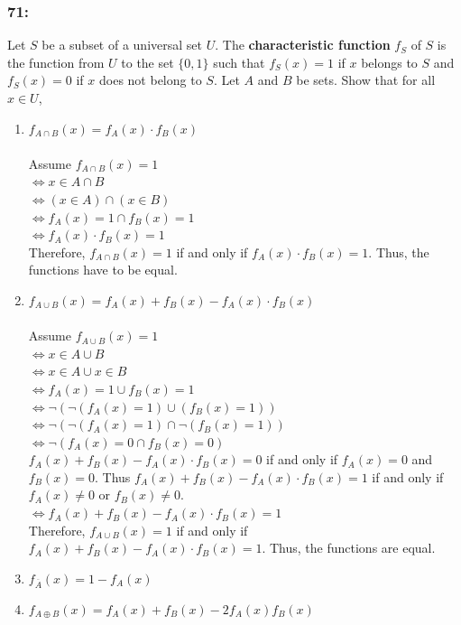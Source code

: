\documentclass[12pt,en,a4paper]{article}
\begin{document}
	\subsubsection*{71:}
	Let $S$ be a subset of a universal set $U$. The \textbf{characteristic function} $f_S$ of $S$ is the function from $U$ to the set $\{0,1\}$ such that $f_S(x)=1$ if $x$ belongs to $S$ and $f_S(x)=0$ if $x$ does not belong to $S$. Let $A$ and $B$ be sets. Show that for all $x\in U$,
	\begin{enumerate}[label=\textbf{\alph*)}]
		\item $f_{A\cap B}(x)=f_A(x)\cdot f_B(x)$\\\\
		Assume $f_{A\cap B}(x)=1$\\
		$\Leftrightarrow x\in A\cap B$\\
		$\Leftrightarrow (x\in A)\cap (x\in B)$\\
		$\Leftrightarrow f_A(x)=1\cap f_B(x)=1$\\
		$\Leftrightarrow f_A(x)\cdot f_B(x)=1$\\
		
		Therefore, $f_{A\cap B}(x)=1$ if and only if $f_A(x)\cdot f_B(x)=1$. Thus, the functions have to be equal.
		\item $f_{A\cup B}(x)=f_A(x)+f_B(x)-f_A(x)\cdot f_B(x)$\\\\
		Assume $f_{A\cup B}(x)=1$\\
		$\Leftrightarrow x\in A\cup B$\\
		$\Leftrightarrow x\in A\cup x\in B$\\
		$\Leftrightarrow f_A(x)=1\cup f_B(x)=1$\\
		$\Leftrightarrow \neg(\neg(f_A(x)=1)\cup(f_B(x)=1))$\\
		$\Leftrightarrow \neg(\neg(f_A(x)=1)\cap\neg(f_B(x)=1))$\\
		$\Leftrightarrow \neg(f_A(x)=0\cap f_B(x)=0)$\\
		
		$f_A(x)+f_B(x)-f_A(x)\cdot f_B(x)=0$ if and only if $f_A(x)=0$ and $f_B(x)=0$. Thus $f_A(x)+f_B(x)-f_A(x)\cdot f_B(x)=1$ if and only if $f_A(x)\neq0$ or $f_B(x)\neq0$.\\
		$\Leftrightarrow f_A(x)+f_B(x)-f_A(x)\cdot f_B(x)=1$\\
		
		Therefore, $f_{A\cup B}(x)=1$ if and only if $f_A(x)+f_B(x)-f_A(x)\cdot f_B(x)=1$. Thus, the functions are equal.
		\item $f_{\overline{A}}(x)=1-f_A(x)$
		\item $f_{A\oplus B}(x)=f_A(x)+f_B(x)-2f_A(x)f_B(x)$
	\end{enumerate}
\newpage
{}
\end{document}
